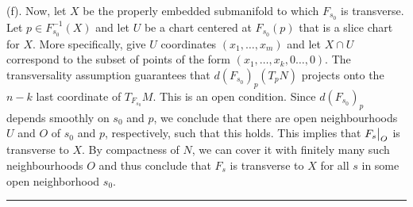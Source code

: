 \documentclass{article}
\newcommand{\restr}[2]{{%
  \left.\kern-\nulldelimiterspace %
  #1 %
  \vphantom{\big|} %
  \right|_{#2} %
  }}
\begin{document}
\vskip 1cm
(f). Now, let $X$ be the properly embedded submanifold to which $F_{s_0}$ is transverse. Let $p \in F_{s_0}^{-1}(X)$ and let $U$ be a chart centered at $F_{s_0}(p)$ that is a slice chart for $X$. More specifically, give $U$ coordinates $(x_1, \dots, x_m)$ and let $X \cap U$ correspond to the subset of points of the form $(x_1, \dots, x_k, 0 \dots, 0)$. The transversality assumption guarantees that $d\left(F_{s_0}\right)_p \left(T_p N\right)$ projects onto the $n-k$ last coordinate of $T_{{F_{s_0}}} M$. This is an open condition. Since $d\left(F_{{s_0}}\right)_p$ depends smoothly on $s_0$ and $p$, we conclude that there are open neighbourhoods $U$ and $O$ of $s_0$ and $p$, respectively, such that this holds. This implies that $\restr{F_s}{O}$ is transverse to $X$. By compactness of $N$, we can cover it with finitely many such neighbourhoods $O$ and thus conclude that $F_s$ is transverse to $X$ for all $s$ in some open neighborhood $s_0$.



\vskip 0.5cm
\hrule 
\vskip 0.5cm







\end{document}
